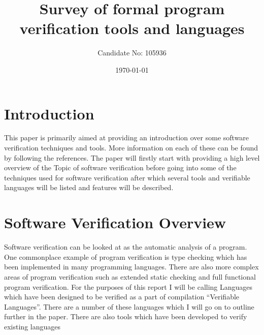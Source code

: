 \documentclass[a4paper,12pt]{scrartcl}
\title{Survey of formal program verification tools and languages}
\author{Candidate No: 105936}
\date{\today}
\begin{document}
	
	\begin{titlepage}
		\maketitle
	\end{titlepage}
	
	\tableofcontents
	\newpage
	\section{Introduction}
	{
		This paper is primarily aimed at providing an introduction over some software verification techniques and tools. More information on each of these can be found by following the references. The paper will firstly start with providing a high level overview of the Topic of software verification before going into some of the techniques used for software verification after which several tools and verifiable languages will be listed and features will be described.
	}

	\section{Software Verification Overview}
	{
		Software verification can be looked at as the automatic analysis of a program. One commonplace example of program verification is type checking which has been implemented in many programming languages. There are also more complex areas of program verification such as extended static checking and full functional program verification. For the purposes of this report I will be calling Languages which have been designed to be verified as a part of compilation \enquote{Verifiable Languages}. There are a number of these languages which I will go on to outline further in the paper. There are also tools which have been developed to verify existing languages
	}
\end{document}
